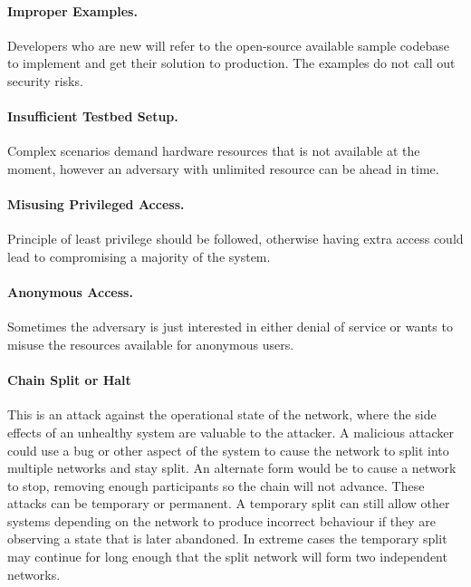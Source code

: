\paragraph{Improper Examples.} Developers who are new will refer to the open-source available sample codebase to implement and get their solution to production. The examples do not call out security risks.

\paragraph{Insufficient Testbed Setup.} Complex scenarios demand hardware resources that is not available at the moment, however an adversary with unlimited resource can be ahead in time.

\paragraph{Misusing Privileged Access.} Principle of least privilege should be followed, otherwise having extra access could lead to compromising a majority of the system.

\paragraph{Anonymous Access.} Sometimes the adversary is just interested in either denial of service or wants to misuse the resources available for anonymous users.

\paragraph{Chain Split or Halt}  This is an attack against the operational state of the network, where the side effects of an unhealthy system are valuable to the attacker.
A malicious attacker could use a bug or other aspect of the system to cause the network to split into multiple networks and stay split.
An alternate form would be to cause a network to stop, removing enough participants so the chain will not advance.
These attacks can be temporary or permanent.
A temporary split can still allow other systems depending on the network to produce incorrect behaviour if they are observing a state that is later abandoned.
In extreme cases the temporary split may continue for long enough that the split network will form two independent networks.
